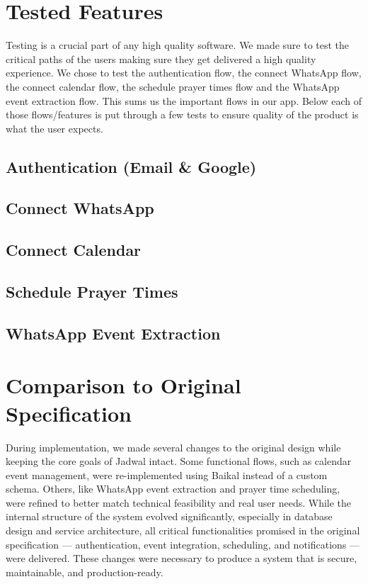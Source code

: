 \section{Tested Features}

Testing is a crucial part of any high quality software. We made sure to test the critical paths of the users making sure they get delivered a high quality experience. We chose to test the authentication flow, the connect WhatsApp flow, the connect calendar flow, the schedule prayer times flow and the WhatsApp event extraction flow. This sums us the important flows in our app. Below each of those flows/features is put through a few tests to ensure quality of the product is what the user expects.

\subsection{Authentication (Email \& Google)}
\subsection{Connect WhatsApp}
\subsection{Connect Calendar}
\subsection{Schedule Prayer Times}
\subsection{WhatsApp Event Extraction}

\section{Comparison to Original Specification}

During implementation, we made several changes to the original design while keeping the core goals of Jadwal intact. Some functional flows, such as calendar event management, were re-implemented using Baikal instead of a custom schema. Others, like WhatsApp event extraction and prayer time scheduling, were refined to better match technical feasibility and real user needs. While the internal structure of the system evolved significantly, especially in database design and service architecture, all critical functionalities promised in the original specification — authentication, event integration, scheduling, and notifications — were delivered. These changes were necessary to produce a system that is secure, maintainable, and production-ready.

